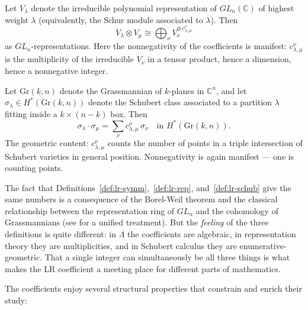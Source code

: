 \begin{definition}
\label{def:lr-rep}
Let $V_\lambda$ denote the irreducible polynomial representation of
$GL_n(\mathbb{C})$ of highest weight $\lambda$ (equivalently, the
Schur module associated to $\lambda$).  Then
\[
  V_\lambda \otimes V_\mu
  \cong \bigoplus_{\nu} V_\nu^{\oplus\, c^{\nu}_{\lambda,\mu}}
\]
as $GL_n$-representations.  Here the nonnegativity of the
coefficients is manifest: $c^{\nu}_{\lambda,\mu}$ is the multiplicity
of the irreducible $V_\nu$ in a tensor product, hence a dimension,
hence a nonneg\-ative integer.
\end{definition}

\begin{definition}
\label{def:lr-schub}
Let $\mathrm{Gr}(k,n)$ denote the Grassmannian of $k$-planes in
$\mathbb{C}^n$, and let $\sigma_\lambda \in H^*(\mathrm{Gr}(k,n))$
denote the Schubert class associated to a partition $\lambda$ fitting
inside a $k \times (n-k)$ box.  Then
\[
  \sigma_\lambda \cdot \sigma_\mu
  = \sum_\nu c^{\nu}_{\lambda,\mu}\, \sigma_\nu
  \quad \text{in } H^*(\mathrm{Gr}(k,n)).
\]
The geometric content: $c^{\nu}_{\lambda,\mu}$ counts the number of
points in a triple intersection of Schubert varieties in general
position.  Nonnegativity is again manifest --- one is counting
points.
\end{definition}

\begin{remark}
The fact that Definitions~\ref{def:lr-symm},~\ref{def:lr-rep},
and~\ref{def:lr-schub} give the same numbers is a consequence of the
Borel-Weil theorem and the classical relationship between the
representation ring of $GL_n$ and the cohomology of Grassmannians
(see \cite{fulton-1997} for a unified treatment).  But the
\emph{feeling} of the three definitions is quite different: in
$\Lambda$ the coefficients are algebraic, in representation theory
they are multiplicities, and in Schubert calculus they are
enumerative-geometric.  That a single integer can simultaneously be
all three things is what makes the LR coefficient a meeting place for
different parts of mathematics.
\end{remark}

The coefficients enjoy several structural properties that constrain
and enrich their study:

